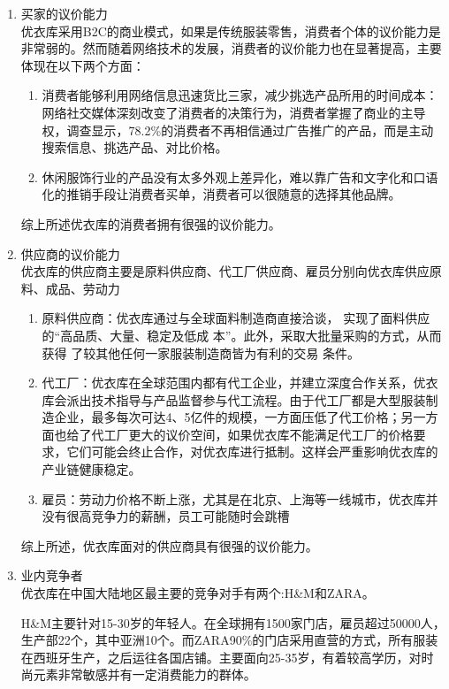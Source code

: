 \documentclass{xjtureport}
\begin{document}
\begin{enumerate}
    \item 买家的议价能力\\
    优衣库采用B2C的商业模式，如果是传统服装零售，消费者个体的议价能力是非常弱的。然而随着网络技术的发展，消费者的议价能力也在显著提高，主要体现在以下两个方面：
    \begin{enumerate}
        \item 消费者能够利用网络信息迅速货比三家，减少挑选产品所用的时间成本：网络社交媒体深刻改变了消费者的决策行为，消费者掌握了商业的主导权，调查显示，78.2\%的消费者不再相信通过广告推广的产品\cite{ref7}，而是主动搜索信息、挑选产品、对比价格。
        \item 休闲服饰行业的产品没有太多外观上差异化，难以靠广告和文字化和口语化的推销手段让消费者买单，消费者可以很随意的选择其他品牌。
    \end{enumerate}
    综上所述优衣库的消费者拥有很强的议价能力。
    \item 供应商的议价能力\\
    优衣库的供应商主要是原料供应商、代工厂供应商、雇员分别向优衣库供应原料、成品、劳动力
    \begin{enumerate}
        \item 原料供应商：优衣库通过与全球面料制造商直接洽谈，
        实现了面料供应的“高品质、大量、稳定及低成
        本”。此外，采取大批量采购的方式，从而获得
        了较其他任何一家服装制造商皆为有利的交易
        条件。
        \item 代工厂：优衣库在全球范围内都有代工企业，并建立深度合作关系，优衣库会派出技术指导与产品监督参与代工流程。由于代工厂都是大型服装制造企业，最多每次可达4、5亿件的规模，一方面压低了代工价格；另一方面也给了代工厂更大的议价空间，如果优衣库不能满足代工厂的价格要求，它们可能会终止合作，对优衣库进行抵制。这样会严重影响优衣库的产业链健康稳定。
        \item 雇员：劳动力价格不断上涨，尤其是在北京、上海等一线城市，优衣库并没有很高竞争力的薪酬，员工可能随时会跳槽
    \end{enumerate}
    综上所述，优衣库面对的供应商具有很强的议价能力。
    \item 业内竞争者\\
        优衣库在中国大陆地区最主要的竞争对手有两个:H\&M和ZARA。
        
        H\&M主要针对15-30岁的年轻人。在全球拥有1500家门店，雇员超过50000人，生产部22个，其中亚洲10个。而ZARA90\%的门店采用直营的方式，所有服装在西班牙生产，之后运往各国店铺。主要面向25-35岁，有着较高学历，对时尚元素非常敏感并有一定消费能力的群体。


\end{enumerate}
\end{document}

